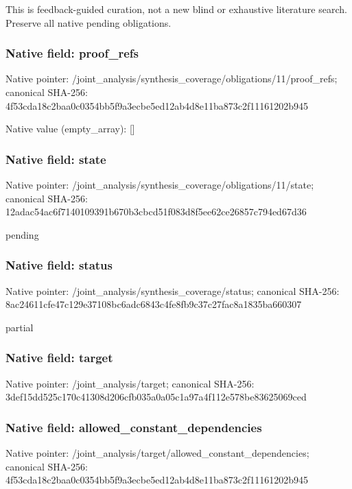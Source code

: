 \documentclass[10pt,a4paper]{article}
\begin{document}
\begingroup\raggedright\sloppy This is feedback-guided curation,\allowbreak{} not a new blind or exhaustive literature search. Preserve all native pending obligations.\par\endgroup

\subsubsection{Native field: proof\_\allowbreak{}refs}
Native pointer: /joint\_\allowbreak{}analysis/synthesis\_\allowbreak{}coverage/obligations/11/proof\_\allowbreak{}refs; canonical SHA-256: 4f53cda18c2baa0c0354bb5f9a3ecbe5ed12ab4d8e11ba873c2f11161202b945

Native value (empty\_\allowbreak{}array): []

\subsubsection{Native field: state}
Native pointer: /joint\_\allowbreak{}analysis/synthesis\_\allowbreak{}coverage/obligations/11/state; canonical SHA-256: 12adac54ac6f7140109391b670b3cbcd51f083d8f5ee62ce26857c794ed67d36

\begingroup\raggedright\sloppy pending\par\endgroup

\subsubsection{Native field: status}
Native pointer: /joint\_\allowbreak{}analysis/synthesis\_\allowbreak{}coverage/status; canonical SHA-256: 8ac24611cfe47c129e37108bc6adc6843c4fe8fb9c37c27fac8a1835ba660307

\begingroup\raggedright\sloppy partial\par\endgroup

\subsubsection{Native field: target}
Native pointer: /joint\_\allowbreak{}analysis/target; canonical SHA-256: 3def15dd525c170c41308d206cfb035a0a05c1a97a4f112e578be83625069ced

\subsubsection{Native field: allowed\_\allowbreak{}constant\_\allowbreak{}dependencies}
Native pointer: /joint\_\allowbreak{}analysis/target/allowed\_\allowbreak{}constant\_\allowbreak{}dependencies; canonical SHA-256: 4f53cda18c2baa0c0354bb5f9a3ecbe5ed12ab4d8e11ba873c2f11161202b945
\end{document}
